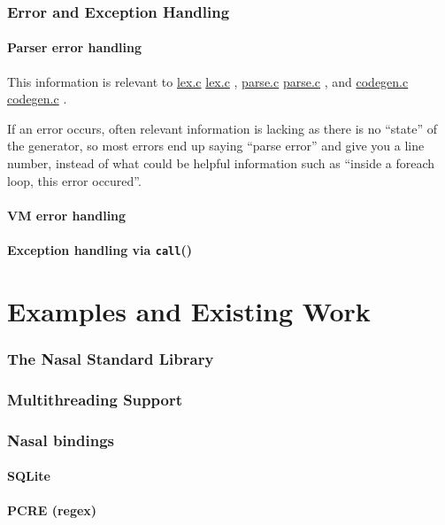 \documentclass{article}
\newcommand{\todo}[1]{}
\newcommand{\func}[1]{\textcolor{func}{\tt #1}}
\newcommand{\nasalsourcefile}[2][]{%
  \ifthenelse{\isempty{#1}}%
    {%
      \textcolor{source}{%
        \href{https://github.com/andyross/nasal/blob/master/src/#2}{#2}%
      }%
    }%
    {%
      \textcolor{source}{%
        \href{https://github.com/andyross/nasal/blob/master/src/#2\#L#1}{#2}%
      }%
    }%
}
\newcommand{\fp}{\textcolor{func}{()}}
\begin{document}
\section{Error and Exception Handling}
\todo{To be written,explain setjmp, longjmp,naRuntimeError, naParseError}
\subsection{Parser error handling}
This information is relevant to \nasalsourcefile{lex.c}, \nasalsourcefile{parse.c}, and \nasalsourcefile{codegen.c}.

If an error occurs, often relevant information is lacking as there is no ``state'' of the generator, so most errors end up saying ``parse error'' and give you a line number, instead of what could be helpful information such as ``inside a foreach loop, this error occured''.

\subsection{VM error handling}
\subsection{Exception handling via \func{call}\fp}

\part{Examples and Existing Work}
\section{The Nasal Standard Library}
\todo{document lib.c, math.c, etc.}

\section{Multithreading Support}
\todo{document threadlib.c}

\section{Nasal bindings}
\subsection {SQLite}
\subsection {PCRE (regex)}
\end{document}
